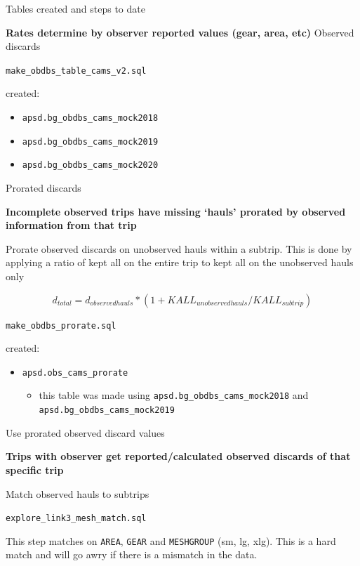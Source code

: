 \documentclass[
  ignorenonframetext,
]{beamer}
\providecommand{\tightlist}{%
  \setlength{\itemsep}{0pt}\setlength{\parskip}{0pt}}
\begin{document}
\begin{frame}[fragile]{Tables created and steps to date}
\protect\hypertarget{tables-created-and-steps-to-date}{}

\textbf{Rates determine by observer reported values (gear, area, etc)}
Observed discards

\texttt{make\_obdbs\_table\_cams\_v2.sql}

created:

\begin{itemize}
\tightlist
\item
  \texttt{apsd.bg\_obdbs\_cams\_mock2018}
\item
  \texttt{apsd.bg\_obdbs\_cams\_mock2019}
\item
  \texttt{apsd.bg\_obdbs\_cams\_mock2020}
\end{itemize}

\end{frame}

\begin{frame}[fragile]{Prorated discards}
\protect\hypertarget{prorated-discards}{}

\textbf{Incomplete observed trips have missing `hauls' prorated by
observed information from that trip}

Prorate observed discards on unobserved hauls within a subtrip. This is
done by applying a ratio of kept all on the entire trip to kept all on
the unobserved hauls only

\[d_{total} = d_{observedhauls}*(1+KALL_{unobserved hauls}/KALL_{subtrip})\]

\texttt{make\_obdbs\_prorate.sql}

created:

\begin{itemize}
\tightlist
\item
  \texttt{apsd.obs\_cams\_prorate}

  \begin{itemize}
  \tightlist
  \item
    this table was made using \texttt{apsd.bg\_obdbs\_cams\_mock2018}
    and \texttt{apsd.bg\_obdbs\_cams\_mock2019}
  \end{itemize}
\end{itemize}

\end{frame}

\begin{frame}[fragile]{Use prorated observed discard values}
\protect\hypertarget{use-prorated-observed-discard-values}{}

\textbf{Trips with observer get reported/calculated observed discards of
that specific trip}

Match observed hauls to subtrips

\texttt{explore\_link3\_mesh\_match.sql}

This step matches on \texttt{AREA}, \texttt{GEAR} and \texttt{MESHGROUP}
(sm, lg, xlg). This is a hard match and will go awry if there is a
mismatch in the data.

\end{frame}
\end{document}
